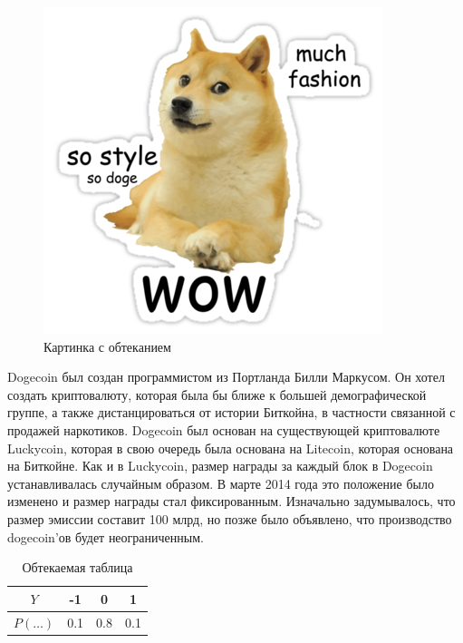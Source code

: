 \documentclass[12pt, a4paper]{article}
\begin{document}
\begin{figure}
	\includegraphics[width=\linewidth]{doge.png}
	\caption{Картинка с обтеканием}
\end{figure}


Dogecoin был создан программистом из Портланда Билли Маркусом. Он хотел создать криптовалюту, которая была бы ближе к большей демографической группе, а также дистанцироваться от истории Биткойна, в частности связанной с продажей наркотиков. Dogecoin был основан на существующей криптовалюте Luckycoin, которая в свою очередь была основана на Litecoin, которая основана на Биткойне. Как и в Luckycoin, размер награды за каждый блок в Dogecoin устанавливалась случайным образом. В марте 2014 года это положение было изменено и размер награды стал фиксированным. Изначально задумывалось, что размер эмиссии составит 100 млрд, но позже было объявлено, что производство dogecoin'ов будет неограниченным.

\begin{table}
\begin{center}
\begin{tabular}{cccc}
\toprule
$Y$ & -1 & 0 & 1  \\
\midrule
$P(\ldots)$ & 0.1 & 0.8 & 0.1 \\
\bottomrule
\end{tabular}
\caption{Обтекаемая таблица}
\end{center}
\end{table}
\end{document}
